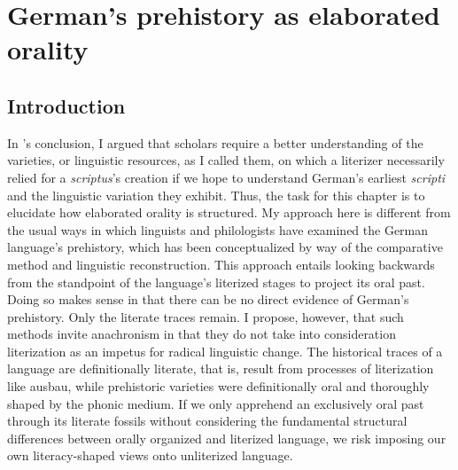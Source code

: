 \chapter{German’s prehistory as elaborated orality}\label{sec:chap:6}

\section{Introduction}
In 's conclusion, I argued that scholars require a better understanding of the varieties, or linguistic resources, as I called them, on which a literizer necessarily relied for a \textit{scriptus}’s creation if we hope to understand German’s earliest \textit{scripti} and the linguistic variation they exhibit. Thus, the task for this chapter is to elucidate how elaborated orality is structured. My approach here is different from the usual ways in which linguists and philologists have examined the German language’s prehistory, which has been conceptualized by way of the comparative method and linguistic reconstruction. This approach entails looking backwards from the standpoint of the language’s literized stages to project its oral past. Doing so makes sense in that there can be no direct evidence of German’s prehistory. Only the literate traces remain. I propose, however, that such methods invite anachronism in that they do not take into consideration literization as an impetus for radical linguistic change. The historical traces of a language are definitionally literate, that is, result from processes of literization like ausbau, while prehistoric varieties were definitionally oral and thoroughly shaped by the phonic medium. If we only apprehend an exclusively oral past through its literate fossils without considering the fundamental structural differences between orally organized and literized language, we risk imposing our own literacy-shaped views onto unliterized language.

